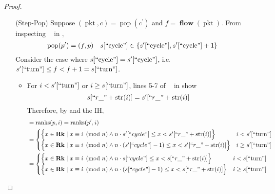 \documentclass{amsart}
\DeclareMathOperator{\pkt}{\mathrm{pkt}}
\DeclareMathOperator{\pop}{\mathrm{pop}}
\DeclareMathOperator{\Rk}{\mathbf{Rk}}
\DeclareMathOperator{\flow}{\mathbf{flow}}
\DeclareMathOperator{\zpostpop}{z_{\mathrm{post-pop}}}
\DeclareMathOperator{\ranks}{\mathrm{ranks}}
\theoremstyle{definition}
\begin{document}
\begin{proof}
\begin{enumerate}
\begin{enumerate}
                \item[(Step-Pop)] Suppose $(\pkt, c) = \pop(c^\prime)$ and $f = \flow(\pkt)$. 
                    From inspecting $\zpostpop$ in ,
                    \begin{align*}
                        \pop(p^\prime) = (f, p) %
                        &&
                        s[``\text{cycle}"] \in \{s^\prime[``\text{cycle}"], s^\prime[``\text{cycle}"] + 1\}
                    \end{align*}
                    Consider the case where $s[``\text{cycle}"] = s^\prime[``\text{cycle}"]$, i.e. $s^\prime[``\text{turn}"] \leq f < f + 1 = s[``\text{turn}"]$.
                    \begin{itemize}
                        \item For $i < s^\prime[``\text{turn}"]$ or $i \geq s[``\text{turn}"]$, lines 5-7 of $\zpostpop$ in  show
                            $$s[``r\_" + \mathrm{str}(i)] = s^\prime[``r\_" + \mathrm{str}(i)]$$
                            Therefore, by  and the IH,
                            \begin{align*}
                                &= \ranks(p, i) = \ranks(p^\prime, i)\\
                                &=
                                    \begin{cases}
                                        \Big\{x \in \Rk \mid x \equiv i \pmod n \land n \cdot s^\prime[``cycle"] \leq x < s^\prime[``r\_" + \mathrm{str}(i)] \Big\} 
                                        & i < s^\prime[``\text{turn}"]\\
                                        \Big\{x \in \Rk \mid x \equiv i \pmod n \land n \cdot (s^\prime[``cycle"] - 1) \leq x < s^\prime[``r\_" + \mathrm{str}(i)]\Big\} 
                                        & i \geq s^\prime[``\text{turn}"]
                                    \end{cases}\\
                                &=
                                    \begin{cases}
                                        \Big\{x \in \Rk \mid x \equiv i \pmod n \land n \cdot s[``cycle"] \leq x < s[``r\_" + \mathrm{str}(i)] \Big\} 
                                        & i < s[``\text{turn}"]\\
                                        \Big\{x \in \Rk \mid x \equiv i \pmod n \land n \cdot (s[``cycle"] - 1) \leq x < s[``r\_" + \mathrm{str}(i)]\Big\} 
                                        & i \geq s[``\text{turn}"]
                                    \end{cases}
                            \end{align*}


\end{itemize}
\end{enumerate}
\end{enumerate}
\end{proof}
\end{document}
